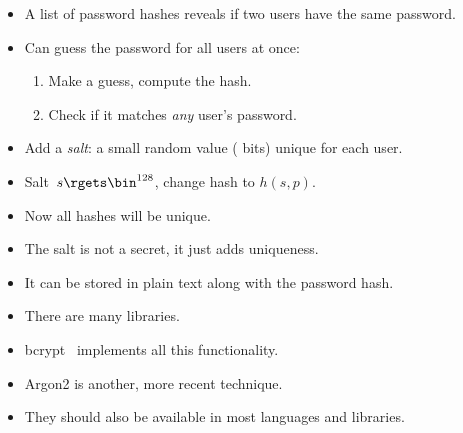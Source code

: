 \begin{frame}
  \begin{remark}
    \begin{itemize}
      \item A list of password hashes reveals if two users have the same 
        password.
      \item Can guess the password for all users at once:
        \begin{enumerate}
          \item Make a guess, compute the hash.
          \item Check if it matches \emph{any} user's password.
        \end{enumerate}
    \end{itemize}
  \end{remark}

  \pause

  \begin{solution}
    \begin{itemize}
      \item Add a \emph{salt}: a small random value ( bits) unique for 
        each user.
      \item Salt~\(s\rgets \bin^{128}\), change hash to \(h(s, p)\).
      \item Now all hashes will be unique.
    \end{itemize}
  \end{solution}
\end{frame}

\begin{frame}
  \begin{remark}
    \begin{itemize}
      \item The salt is not a secret, it just adds uniqueness.
      \item It can be stored in plain text along with the password hash.
    \end{itemize}
  \end{remark}
\end{frame}

\begin{frame}
  \begin{example}
    \begin{itemize}
      \item There are many libraries.
      \item bcrypt~\cite{bcrypt} implements all this functionality.
      \item Argon2 is another, more recent technique.
      \item They should also be available in most languages and libraries.
    \end{itemize}
  \end{example}
\end{frame}

